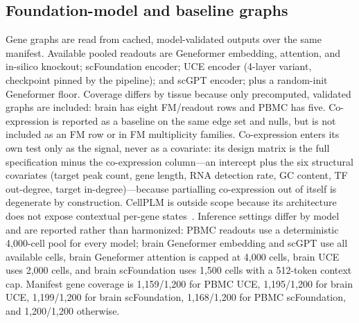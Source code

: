 \documentclass[fleqn,10pt,lineno]{wlpeerj}
\begin{document}
\subsection{Foundation-model and baseline graphs}
Gene graphs are read from cached, model-validated outputs over the same manifest. Available pooled
readouts are Geneformer embedding, attention, and in-silico knockout; scFoundation encoder; UCE
encoder (4-layer variant, checkpoint pinned by the pipeline); and scGPT encoder; plus a
random-init Geneformer floor. Coverage differs by tissue because
only precomputed, validated graphs are included: brain has eight FM/readout rows and PBMC has five.
Co-expression is reported as a baseline on the same edge set and nulls, but is not included as an
FM row or in FM multiplicity families. Co-expression enters its own test only as the signal,
never as a covariate: its design matrix is the full specification minus the
co-expression column---an intercept plus the six structural covariates (target peak count, gene
length, RNA detection rate, GC content, TF out-degree, target in-degree)---because partialling
co-expression out of itself is degenerate by construction. CellPLM is outside scope because its
architecture does not
expose contextual per-gene states~\citep{wen2024cellplm}. Inference settings differ by model and
are reported rather than harmonized: PBMC readouts use a deterministic 4,000-cell pool for every
model; brain Geneformer embedding and scGPT use all available cells, brain Geneformer attention is
capped at 4,000 cells, brain UCE uses 2,000 cells, and brain scFoundation uses 1,500 cells with a
512-token context cap. Manifest gene coverage is 1,159/1,200 for PBMC UCE, 1,195/1,200 for brain
UCE, 1,199/1,200 for brain scFoundation, 1,168/1,200 for PBMC scFoundation, and 1,200/1,200
otherwise.
\end{document}
